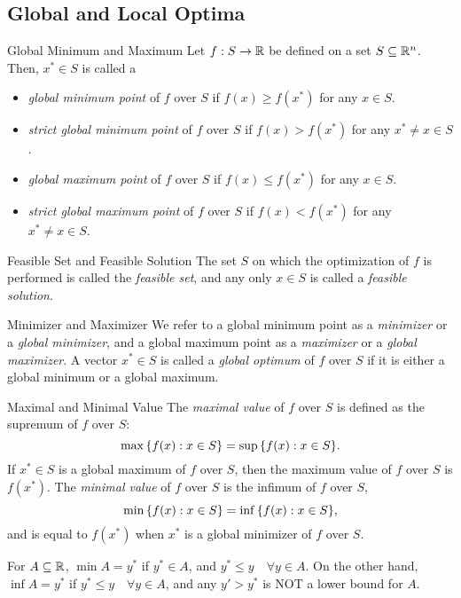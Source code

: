 \subsection{Global and Local Optima}
\begin{df}{Global Minimum and Maximum}
	Let $f:S\to{\mathbb{R}}$ be defined on a set $S\subseteq{\mathbb{R}}^n$. Then, $x^*\in S$ is called a
	\begin{itemize}
		\item \textit{global minimum point} of $f$ over $S$ if $f(x)\geq f(x^*)$ for any $x\in S$.
		\item \textit{strict global minimum point} of $f$ over $S$ if $f(x)>f(x^*)$ for any $x^*\neq x\in S$.
		\item \textit{global maximum point} of $f$ over $S$ if $f(x)\leq f(x^*)$ for any $x\in S$.
		\item \textit{strict global maximum point} of $f$ over $S$ if $f(x)<f(x^*)$ for any $x^*\neq x\in S$.
	\end{itemize}
\end{df}
\begin{df}{Feasible Set and Feasible Solution}
	The set $S$ on which the optimization of $f$ is performed is called the \textit{feasible set}, and any only $x\in S$ is called a \textit{feasible solution}.
\end{df}
\begin{df}{Minimizer and Maximizer}
	We refer to a global minimum point as a \textit{minimizer} or a \textit{global minimizer}, and a global maximum point as a \textit{maximizer} or a \textit{global maximizer}. A vector $x^*\in S$ is called a \textit{global optimum} of $f$ over $S$ if it is either a global minimum or a global maximum. 
\end{df}
\begin{df}{Maximal and Minimal Value}
	The \textit{maximal value} of $f$ over $S$ is defined as the supremum of $f$ over $S$: \[\max\qty{f(x):x\in S}=\sup\qty{f(x):x\in S}.\] If $x^*\in S$ is a global maximum of $f$ over $S$, then the maximum value of $f$ over $S$ is $f(x^*)$. The \textit{minimal value} of $f$ over $S$ is the infimum of $f$ over $S$, \[\min\qty{f(x):x\in S}=\inf\qty{f(x):x\in S},\] and is equal to $f(x^*)$ when $x^*$ is a global minimizer of $f$ over $S$. 
\end{df}
\begin{rmk} For $A\subseteq{\mathbb{R}}$, $\min A=y^*$ if $y^*\in A$, and $y^*\leq y\quad\forall y\in A$. On the other hand, $\inf A=y^*$ if  $y^*\leq y\quad\forall y\in A$, and any $y'>y^*$ is NOT a lower bound for $A$. 
\end{rmk}
